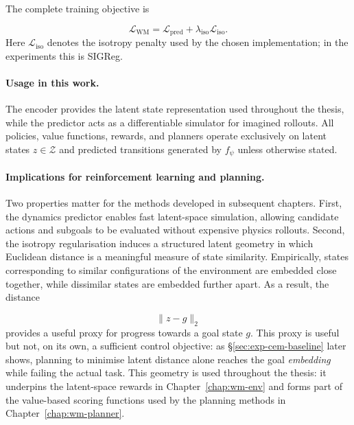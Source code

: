 The complete training objective is

\begin{equation}
\mathcal{L}_{\mathrm{WM}}
=
\mathcal{L}_{\mathrm{pred}}
+
\lambda_{\mathrm{iso}}
\mathcal{L}_{\mathrm{iso}}.
\label{eq:lewm-total-clean}
\end{equation}
Here $\mathcal{L}_{\mathrm{iso}}$ denotes the isotropy penalty used by
the chosen implementation; in the experiments this is SIGReg.

\paragraph{Usage in this work.}
The encoder provides the latent state representation used throughout
the thesis, while the predictor acts as a differentiable simulator for
imagined rollouts. All policies, value functions, rewards, and planners
operate exclusively on latent states
$z\in\mathcal Z$ and predicted transitions generated by
$f_\psi$ unless otherwise stated.

\paragraph{Implications for reinforcement learning and planning.}

Two properties matter for the methods developed in subsequent chapters.
First, the dynamics predictor enables fast latent-space simulation,
allowing candidate actions and subgoals to be evaluated without
expensive physics rollouts.
Second, the isotropy regularisation induces a structured latent
geometry in which Euclidean distance is a meaningful measure of state
similarity. Empirically,
states corresponding to similar configurations of the environment are
embedded close together, while dissimilar states are embedded further
apart. As a result, the distance

\begin{equation}
\|z-g\|_2
\end{equation}
provides a useful proxy for progress towards a goal state $g$. This
proxy is useful but not, on its own, a sufficient control objective: as
\S\ref{sec:exp-cem-baseline} later shows, planning to minimise latent
distance alone reaches the goal \emph{embedding} while failing the actual
task.
This geometry is used throughout the thesis: it underpins the
latent-space rewards in Chapter~\ref{chap:wm-env} and forms part of the
value-based scoring functions used by the planning methods in
Chapter~\ref{chap:wm-planner}.

